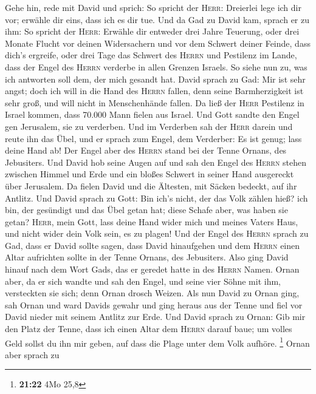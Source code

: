  Gehe hin, rede mit David und sprich: So spricht der
\textsc{Herr}: Dreierlei lege ich dir vor; erwähle dir eins, dass ich es
dir tue.  Und da Gad zu David kam, sprach er zu ihm: So
spricht der \textsc{Herr}: Erwähle dir  entweder drei
Jahre Teuerung, oder drei Monate Flucht vor deinen Widersachern und vor
dem Schwert deiner Feinde, dass dich's ergreife, oder drei Tage das
Schwert des \textsc{Herrn} und Pestilenz im Lande, dass der Engel des
\textsc{Herrn} verderbe in allen Grenzen Israels. So siehe nun zu, was
ich antworten soll dem, der mich gesandt hat.  David
sprach zu Gad: Mir ist sehr angst; doch ich will in die Hand des
\textsc{Herrn} fallen, denn seine Barmherzigkeit ist sehr groß, und will
nicht in Menschenhände fallen.  Da ließ der \textsc{Herr}
Pestilenz in Israel kommen, dass 70.000 Mann fielen aus Israel.
 Und Gott sandte den Engel gen Jerusalem, sie zu
verderben. Und im Verderben sah der \textsc{Herr} darein und reute ihn
das Übel, und er sprach zum Engel, dem Verderber: Es ist genug; lass
deine Hand ab! Der Engel aber des \textsc{Herrn} stand bei der Tenne
Ornans, des Jebusiters.  Und David hob seine Augen auf
und sah den Engel des \textsc{Herrn} stehen zwischen Himmel und Erde und
ein bloßes Schwert in seiner Hand ausgereckt über Jerusalem. Da fielen
David und die Ältesten, mit Säcken bedeckt, auf ihr Antlitz.
 Und David sprach zu Gott: Bin ich's nicht, der das Volk
zählen hieß? ich bin, der gesündigt und das Übel getan hat; diese Schafe
aber, was haben sie getan? \textsc{Herr}, mein Gott, lass deine Hand
wider mich und meines Vaters Haus, und nicht wider dein Volk sein, es zu
plagen!  Und der Engel des \textsc{Herrn} sprach zu Gad,
dass er David sollte sagen, dass David hinaufgehen und dem
\textsc{Herrn} einen Altar aufrichten sollte in der Tenne Ornans, des
Jebusiters.  Also ging David hinauf nach dem Wort Gads,
das er geredet hatte in des \textsc{Herrn} Namen.  Ornan
aber, da er sich wandte und sah den Engel, und seine vier Söhne mit ihm,
versteckten sie sich; denn Ornan drosch Weizen.  Als nun
David zu Ornan ging, sah Ornan und ward Davids gewahr und ging heraus
aus der Tenne und fiel vor David nieder mit seinem Antlitz zur Erde.
 Und David sprach zu Ornan: Gib mir den Platz der Tenne,
dass ich einen Altar dem \textsc{Herrn} darauf baue; um volles Geld
sollst du ihn mir geben, auf dass die Plage unter dem Volk aufhöre.
\footnote{\textbf{21:22} 4Mo 25,8}  Ornan aber sprach zu
